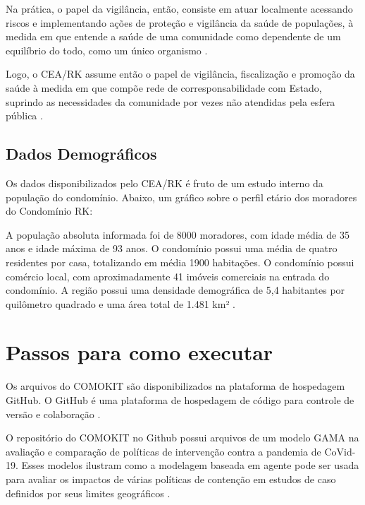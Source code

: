 Na prática, o papel da vigilância, então, consiste em atuar localmente acessando riscos e implementando ações de proteção e vigilância da saúde de populações, à medida em que entende a saúde de uma comunidade como dependente de um equilíbrio do todo, como um único organismo \cite{romao2019aspectos}.

Logo, o CEA/RK assume então o papel de vigilância, fiscalização e promoção da saúde à medida em que compõe rede de corresponsabilidade com Estado, suprindo as necessidades da comunidade por vezes não atendidas pela esfera pública \cite{miranda2020acompanhamento}.

\subsection{Dados Demográficos}

Os dados disponibilizados pelo CEA/RK é fruto de um estudo interno da população do condomínio. Abaixo, um gráfico sobre o perfil etário dos moradores do Condomínio RK:


A população absoluta informada foi de 8000 moradores, com idade média de 35 anos e idade máxima de 93 anos. O condomínio possui uma média de quatro residentes por casa, totalizando em média 1900 habitações. O condomínio possui comércio local, com aproximadamente 41 imóveis comerciais na entrada do condomínio. A região possui uma densidade demográfica de 5,4 habitantes por quilômetro quadrado e uma área total de 1.481 km² \cite{}.

\section{Passos para como executar}

Os arquivos do COMOKIT são disponibilizados na plataforma de hospedagem GitHub. O GitHub é uma plataforma de hospedagem de código para controle de versão e colaboração \cite{githubdocumentation:online}.

O repositório do COMOKIT no Github possui arquivos de um modelo GAMA na avaliação e comparação de políticas de intervenção contra a pandemia de CoVid-19. Esses modelos ilustram como a modelagem baseada em agente pode ser usada para avaliar os impactos de várias políticas de contenção em estudos de caso definidos por seus limites geográficos \cite{GithubCOMOKIT:online}.

